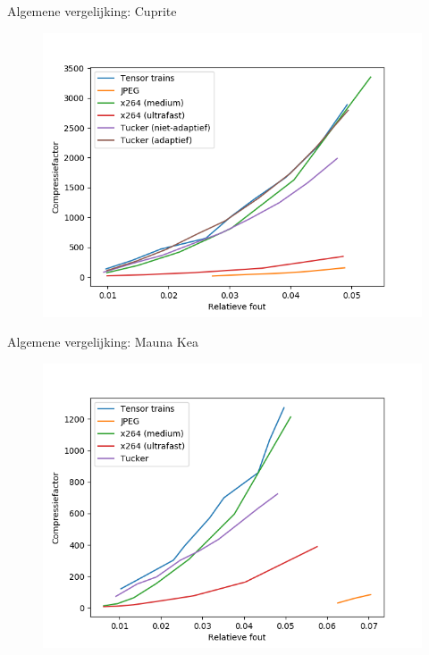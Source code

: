 \documentclass[t,12pt,dutch
\ifx\beamermode\undefined\else,\beamermode\fi
]{beamer}
\begin{document}
\begin{frame}{Algemene vergelijking: Cuprite}

\begin{figure}[H]
\centering
\includegraphics[scale=0.5]{images/general_comparison_new_Cuprite.png}
\end{figure}

\end{frame}

\begin{frame}{Algemene vergelijking: Mauna Kea}

\begin{figure}[H]
\centering
\includegraphics[scale=0.5]{images/general_comparison_new_Mauna_Kea.png}
\end{figure}

\end{frame}
\end{document}
